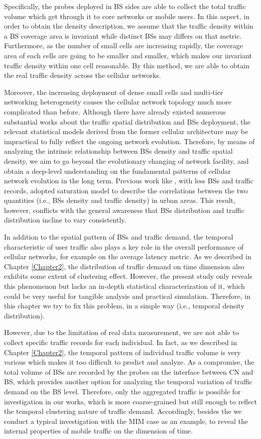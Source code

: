 Specifically, the probes deployed in BS sides are able to collect the total traffic volume which get through it to core networks or mobile users. In this aspect, in order to obtain the density description, we assume that the traffic density within a BS coverage area is invariant while distinct BSs may differs on that metric. Furthermore, as the number of small cells are increasing rapidly, the coverage area of each cells are going to be smaller and smaller, which makes our invariant traffic density within one cell reasonable. By this method, we are able to obtain the real traffic density across the cellular networks.

Moreover, the increasing deployment of dense small cells and multi-tier networking heterogeneity causes the cellular network topology much more complicated than before. Although there have already existed numerous substantial works about the traffic spatial distribution and BSs deployment, the relevant statistical models derived from the former cellular architecture may be impractical to fully reflect the ongoing network evolution. Therefore, by means of analyzing the intrinsic relationship between BSs density and traffic spatial density, we aim to go beyond the evolutionary changing of network facility, and obtain a deep-level understanding on the fundamental patterns of cellular network evolution in the long term. Previous work like \cite{zhou2015spatial}, with less BSs and traffic records, adopted saturation model to describe the correlations between the two quantities (i.e., BSs density and traffic density) in urban areas. This result, however, conflicts with the general awareness that BSs distribution and traffic distribution incline to vary consistently.

In addition to the spatial pattern of BSs and traffic demand, the temporal characteristic of user traffic also plays a key role in the overall performance of cellular networks, for example on the average latency metric. As we described in Chapter \ref{Chapter2}, the distribution of traffic demand on time dimension also exhibits some extent of clustering effect. However, the present study only reveals this phenomenon but lacks an in-depth statistical characterization of it, which could be very useful for tangible analysis and practical simulation. Therefore, in this chapter we try to fix this problem, in a simple way (i.e., temporal density distribution).

However, due to the limitation of real data measurement, we are not able to collect specific traffic records for each individual. In fact, as we described in Chapter \ref{Chapter2}, the temporal pattern of individual traffic volume is very various which makes it too difficult to predict and analyze. As a compromise, the total volume of BSs are recorded by the probes on the interface between CN and BS, which provides another option for analyzing the temporal variation of traffic demand on the BS level. Therefore, only the aggregated traffic is possible for investigation in our works, which is more coarse-grained but still enough to reflect the temporal clustering nature of traffic demand. Accordingly, besides the we conduct a typical investigation with the MIM case as an example, to reveal the internal properties of mobile traffic on the dimension of time.

